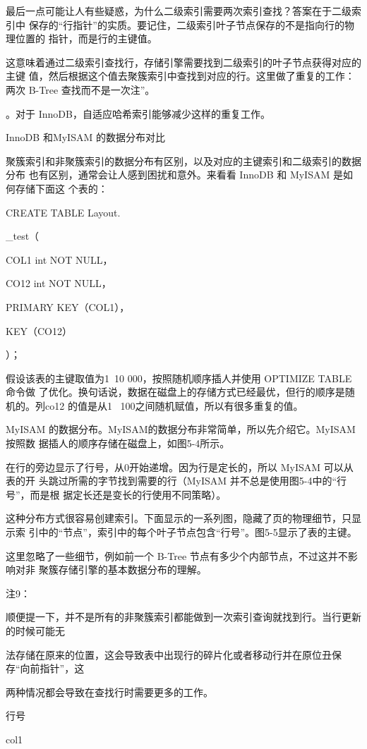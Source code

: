 最后一点可能让人有些疑惑，为什么二级索引需要两次索引查找？答案在于二级索引中
保存的“行指针”的实质。要记住，二级索引叶子节点保存的不是指向行的物理位置的
指针，而是行的主键值。

这意味着通过二级索引查找行，存储引擎需要找到二级索引的叶子节点获得对应的主键
值，然后根据这个值去聚簇索引中查找到对应的行。这里做了重复的工作：两次 B-Tree
查找而不是一次注”。

。对于 InnoDB，自适应哈希索引能够减少这样的重复工作。

InnoDB 和MyISAM 的数据分布对比

聚簇索引和非聚簇索引的数据分布有区别，以及对应的主键索引和二级索引的数据分布
也有区别，通常会让人感到困扰和意外。来看看 InnoDB 和 MyISAM 是如何存储下面这
个表的：

CREATE TABLE Layout.

\_test（

COL1 int NOT NULL，

CO12 int NOT NULL，

PRIMARY KEY（COL1），

KEY（CO12）

）；

假设该表的主键取值为1~10 000，按照随机顺序插人并使用 OPTIMIZE TABLE 命令做
了优化。换句话说，数据在磁盘上的存储方式已经最优，但行的顺序是随机的。列co12
的值是从1 ~100之间随机赋值，所以有很多重复的值。

MyISAM 的数据分布。MyISAM的数据分布非常简单，所以先介绍它。MyISAM 按照数
据插人的顺序存储在磁盘上，如图5-4所示。

在行的旁边显示了行号，从0开始递增。因为行是定长的，所以 MyISAM 可以从表的开
头跳过所需的字节找到需要的行（MyISAM 并不总是使用图5-4中的“行号”，而是根
据定长还是变长的行使用不同策略）。

这种分布方式很容易创建索引。下面显示的一系列图，隐藏了页的物理细节，只显示索
引中的“节点”，索引中的每个叶子节点包含“行号”。图5-5显示了表的主键。

这里忽略了一些细节，例如前一个 B-Tree 节点有多少个内部节点，不过这并不影响对非
聚簇存储引擎的基本数据分布的理解。

注9：

顺便提一下，并不是所有的非聚簇索引都能做到一次索引查询就找到行。当行更新的时候可能无

法存储在原来的位置，这会导致表中出现行的碎片化或者移动行并在原位丑保存“向前指针”，这

两种情况都会导致在查找行时需要更多的工作。

行号

col1

